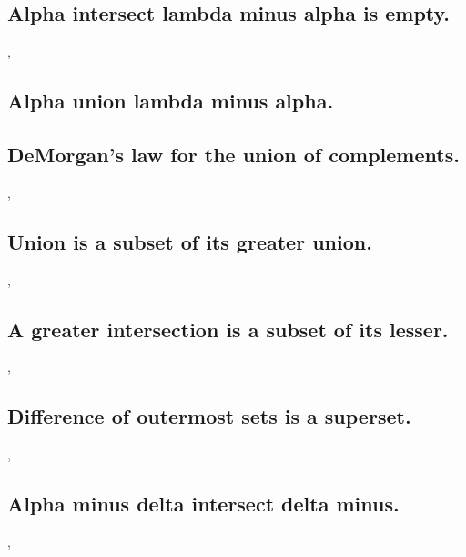 \documentclass[preview]{standalone}
\begin{document}
\subsection{Alpha intersect lambda minus alpha is empty.}

\sep

\subsection{Alpha union lambda minus alpha.}

\pagebreak


\subsection{DeMorgan's law for the union of complements.}

\sep


\subsection{Union is a subset of its greater union.}

\sep
\pagebreak


\subsection{A greater intersection is a subset of its lesser.}

\sep


\subsection{Difference of outermost sets is a superset.}

\sep
\pagebreak


\subsection{Alpha minus delta intersect delta minus.}

\sep
\pagebreak
\end{document}
